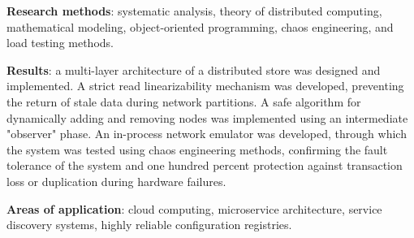 \textbf{Research methods}: systematic analysis, theory of distributed computing, mathe\-matical modeling, object-oriented programming, chaos engineering, and load testing methods.

\textbf{Results}: a multi-layer architecture of a distributed store was designed and implemented. A strict read linearizability mechanism was developed, preventing the return of stale data during network partitions. A safe algorithm for dynamically adding and removing nodes was implemented using an intermediate "observer" phase. An in-process network emulator was developed, through which the system was tested using chaos engineering methods, confirming the fault tolerance of the system and one hundred percent protection against transaction loss or duplication during hardware failures.

\textbf{Areas of application}: cloud computing, microservice architecture, service discovery systems, highly reliable configuration registries.
